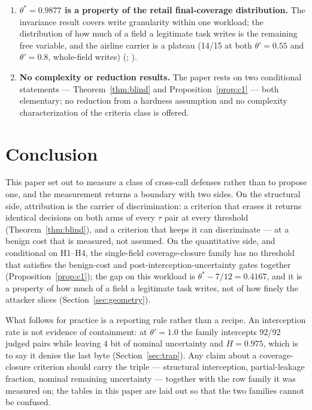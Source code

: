 \documentclass[preprint,12pt]{elsarticle}
\begin{document}
\begin{enumerate}
  complete-reconstruction rate 0/104, utility 1.00) is a within-construction lens reading with
  benign depth below $\theta$ by construction; the real-workload misfire is 38/68 = 55.9\%
  (, row \texttt{C001}).
\item \textbf{$\theta^{*} = 0.9877$ is a property of the retail final-coverage distribution.} The
  invariance result covers write granularity within one workload; the distribution of how much of
  a field a legitimate task writes is the remaining free variable, and the airline carrier is a
  plateau (14/15 at both $\theta'=0.55$ and $\theta'=0.8$, whole-field writes)
  (; ).
\item \textbf{No complexity or reduction results.} The paper rests on two conditional statements
  --- Theorem~\ref{thm:blind} and Proposition~\ref{prop:c1} --- both elementary; no reduction from
  a hardness assumption and no complexity characterization of the criteria class is offered.
\end{enumerate}

\section{Conclusion}\label{sec:conclusion}

This paper set out to measure a class of cross-call defenses rather than to propose one, and the
measurement returns a boundary with two sides. On the structural side, attribution is the carrier
of discrimination: a criterion that erases it returns identical decisions on both arms of every
$\tau$ pair at every threshold (Theorem~\ref{thm:blind}), and a criterion that keeps it can
discriminate --- at a benign cost that is measured, not assumed. On the quantitative side, and
conditional on H1--H4, the single-field coverage-closure family has no threshold that satisfies the
benign-cost and post-interception-uncertainty gates together (Proposition~\ref{prop:c1}); the gap
on this workload is $\theta^{*} - 7/12 = 0.4167$, and it is a property of how much of a field a
legitimate task writes, not of how finely the attacker slices (Section~\ref{sec:geometry}).

What follows for practice is a reporting rule rather than a recipe. An interception rate is not
evidence of containment: at $\theta'=1.0$ the family intercepts 92/92 judged pairs while leaving 4
bit of nominal uncertainty and $H = 0.975$, which is to say it denies the last byte
(Section~\ref{sec:trap}). Any claim about a coverage-closure criterion should carry the triple ---
structural interception, partial-leakage fraction, nominal remaining uncertainty --- together with
the row family it was measured on; the tables in this paper are laid out so that the two families
cannot be confused.
\end{document}

